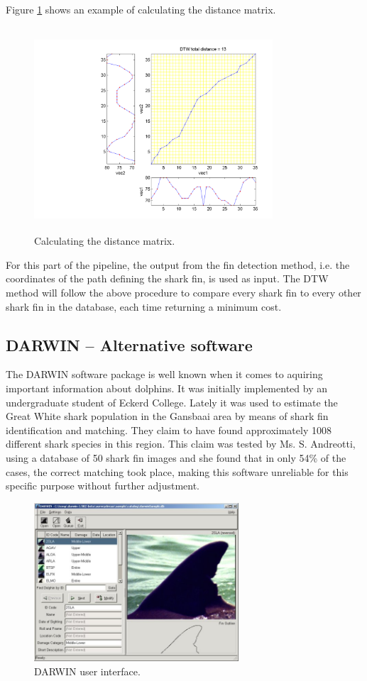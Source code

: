 \documentclass[a4paper,10pt]{article}
\begin{document}
Figure \ref{dtw1} shows an example of calculating the distance matrix.

\begin{figure}[H]
 \centering
 \includegraphics[width=3.5in, height=3in]{dtw1.png}
 \caption{Calculating the distance matrix\cite{dtw}.}
 \label{dtw1}
\end{figure}

For this part of the pipeline, the output from the fin detection method, i.e.
the coordinates of the path defining the shark fin, is used as input.  The DTW
method will follow the above procedure to compare every shark fin to every
other shark fin in the database, each time returning a minimum cost.  \\

\subsection{DARWIN -- Alternative software}
The DARWIN\cite{Darwin} software package is well known when it comes to
aquiring important information about dolphins.  It was initially implemented
by an undergraduate student of
Eckerd College.
Lately it was used to estimate the Great White shark population in the
Gansbaai area by means of shark fin identification and matching.  They claim to
have found approximately
1008 different shark species in this region.  This
claim was tested by Ms. S. Andreotti, using a database of 50 shark fin images and she found that in only
54\% of the cases, the correct matching took place, making this software
unreliable for this specific purpose without further adjustment.

\begin{figure}[H]
 \centering
 \includegraphics[width=3in]{Darwin.jpg}
 \caption{DARWIN user interface. \cite{Darwin}}
\end{figure}
\end{document}
